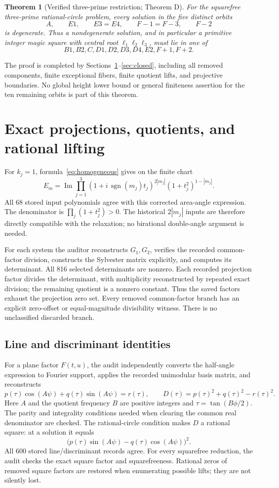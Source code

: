 \documentclass[11pt,letterpaper]{article}
\newtheorem{theorem}{Theorem}[section]
\theoremstyle{definition}\newtheorem{definition}[theorem]{Definition}
\theoremstyle{remark}\newtheorem{remark}[theorem]{Remark}
\newcommand{\im}{\operatorname{Im}}\newcommand{\Impart}{\operatorname{Im}}
\begin{document}
\begin{theorem}[Verified three-prime restriction; Theorem D]\label{thm:three}
For the squarefree three-prime rational-circle problem, every solution in the five distinct orbits
\[
A,\qquad E1,\qquad E3=E4,\qquad F{-}1=F{-}3,\qquad F{-}2
\]
is degenerate. Thus a nondegenerate solution, and in particular a primitive integer magic square with central root $\ell_1\ell_2\ell_3$, must lie in one of
\[
B1,B2,C,D1,D2,D3,D4,E2,F{+}1,F{+}2.
\]
\end{theorem}
The proof is completed by Sections~\ref{sec:projections}--\ref{sec:closed}, including all removed components, finite exceptional fibers, finite quotient lifts, and projective boundaries. No global height lower bound or general finiteness assertion for the ten remaining orbits is part of this theorem.

\section{Exact projections, quotients, and rational lifting}\label{sec:projections}
For $k_j=1$, formula~\eqref{eq:homogeneous} gives on the finite chart
\[
E_m=\im\prod_{j=1}^3(1+i\,\operatorname{sgn}(m_j)t_j)^{2|m_j|}(1+t_j^2)^{1-|m_j|}.
\]
All 68 stored input polynomials agree with this corrected area-angle expression. The denominator is $\prod_j(1+t_j^2)>0$. The historical $2|m_j|$ inputs are therefore directly compatible with the relaxation; no birational double-angle argument is needed.

For each system the auditor reconstructs $G_1,G_2$, verifies the recorded common-factor division, constructs the Sylvester matrix explicitly, and computes its determinant. All 816 selected determinants are nonzero. Each recorded projection factor divides the determinant, with multiplicity reconstructed by repeated exact division; the remaining quotient is a nonzero constant. Thus the saved factors exhaust the projection zero set. Every removed common-factor branch has an explicit zero-offset or equal-magnitude divisibility witness. There is no unclassified discarded branch.

\subsection{Line and discriminant identities}
For a plane factor $F(t,u)$, the audit independently converts the half-angle expression to Fourier support, applies the recorded unimodular basis matrix, and reconstructs
\[
p(\tau)\cos(A\psi)+q(\tau)\sin(A\psi)=r(\tau),
\qquad D(\tau)=p(\tau)^2+q(\tau)^2-r(\tau)^2.
\]
Here $A$ and the quotient frequency $B$ are positive integers and $\tau=\tan(B\phi/2)$. The parity and integrality conditions needed when clearing the common real denominator are checked. The rational-circle condition makes $D$ a rational square: at a solution it equals
\[
\bigl(p(\tau)\sin(A\psi)-q(\tau)\cos(A\psi)\bigr)^2.
\]
All 600 stored line/discriminant records agree. For every squarefree reduction, the audit checks the exact square factor and squarefreeness. Rational zeros of removed square factors are restored when enumerating possible lifts; they are not silently lost.
\end{document}
